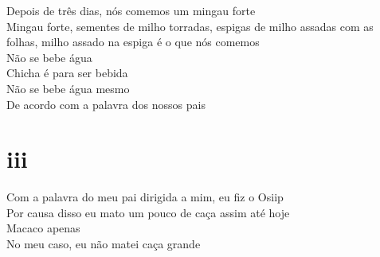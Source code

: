 \begin{linenumbers}
 
\noindent Depois de três dias, nós comemos um mingau forte\\
 Mingau forte, sementes de milho torradas, espigas de milho assadas com as folhas, milho assado na espiga é o que nós comemos\\
 Não se bebe água\\
 Chicha é para ser bebida\\
 Não se bebe água mesmo\\
 De acordo com a palavra dos nossos pais
 
 
 \medskip
 \section{iii}

 \noindent Com a palavra do meu pai dirigida a mim, eu fiz o Osiip\\
 Por causa disso eu mato um pouco de caça assim até hoje\\
 Macaco apenas\\
 No meu caso, eu não matei caça grande
 
\end{linenumbers}

\bigskip

